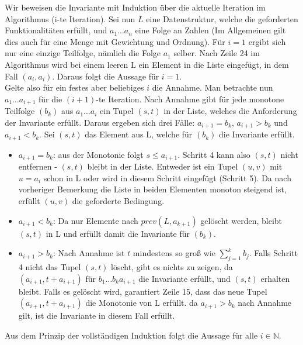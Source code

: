 \begin{beweis}
Wir beweisen die Invariante mit Induktion über die aktuelle Iteration im Algorithmus (i-te Iteration). Sei nun $L$ eine Datenstruktur, welche die geforderten Funktionalitäten erfüllt, und $a_1 \dots a_n$ eine Folge an Zahlen (Im Allgemeinen gilt dies auch für eine Menge mit Gewichtung und Ordnung). Für $i=1$ ergibt sich nur eine einzige Teilfolge, nämlich die Folge $a_1$ selber. Nach Zeile 24 im Algorithmus wird bei einem leeren L ein Element in die Liste eingefügt, in dem Fall $(a_i,a_i)$. Daraus folgt die Aussage für $i=1$.\\
Gelte also für ein festes aber beliebiges $i$ die Annahme. Man betrachte nun $a_1 \dots a_{i+1}$ für die $(i+1)$-te Iteration. Nach Annahme gibt für jede monotone Teilfolge $(b_k)$ aus $a_1 \dots a_{i}$ ein Tupel $(s,t)$ in der Liste, welches die Anforderung der Invariante erfüllt. Daraus ergeben sich drei Fälle: $a_{i+1}=b_k$, $a_{i+1}>b_k$ und $a_{i+1} < b_k$. Sei $(s,t)$ das Element aus L, welche für $(b_{k})$ die Invariante erfüllt.
\begin{itemize}
 
    \item $a_{i+1}=b_k$: aus der Monotonie folgt $s\leq a_{i+1}$. Schritt 4 kann also $(s,t)$ nicht entfernen - $(s,t)$ bleibt in der Liste. Entweder ist ein Tupel $(u,v)$ mit $u=a_i$ schon in L oder wird in diesem Schritt eingefügt (Schritt 5). Da nach vorheriger Bemerkung die Liste in beiden Elementen monoton steigend ist, erfüllt $(u,v)$ die geforderte Bedingung.
    \item $a_{i+1}<b_k$: Da nur Elemente nach $prev(L,a_{k+1})$ gelöscht werden, bleibt $(s,t)$ in L und erfüllt damit die Invariante für $(b_k)$.
    \item $a_{i+1} > b_k$: Nach Annahme ist $t$ mindestens so groß wie $\sum_{j=1}^k b_j$. Falls Schritt 4 nicht das Tupel $(s,t)$ löscht, gibt es nichts zu zeigen, da $(a_{i+1},t+a_{i+1})$ für $b_1 \dots b_k a_{i+1}$ die Invariante erfüllt, und $(s,t)$ erhalten bleibt. Falls es gelöscht wird, garantiert Zeile 15, dass das neue Tupel $(a_{i+1},t+a_{i+1})$ die Monotonie von L erfüllt. da $a_{i+1}>b_k$ nach Annahme gilt, ist die Invariante in diesem Fall erfüllt.
\end{itemize}

Aus dem Prinzip der vollständigen Induktion folgt die Aussage für alle $i \in \mathbb{N}$.

\end{beweis}



